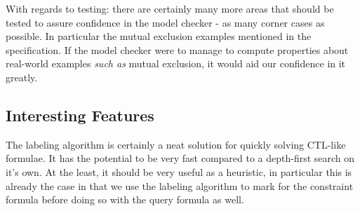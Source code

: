 \documentclass[]{article}
\begin{document}
With regards to testing: there are certainly many more areas that should be tested to assure confidence in the model checker - as many corner cases as possible. In particular the mutual exclusion examples mentioned in the specification. If the model checker were to manage to compute properties about real-world examples \emph{such as} mutual exclusion, it would aid our confidence in it greatly.
\subsection{Interesting Features}
The labeling algorithm is certainly a neat solution for quickly solving CTL-like formulae. It has the potential to be very fast compared to a depth-first search on it's own. At the least, it should be very useful as a heuristic, in particular this is already the case in that we use the labeling algorithm to mark for the constraint formula before doing so with the query formula as well.

\nocite{*}


\end{document}
